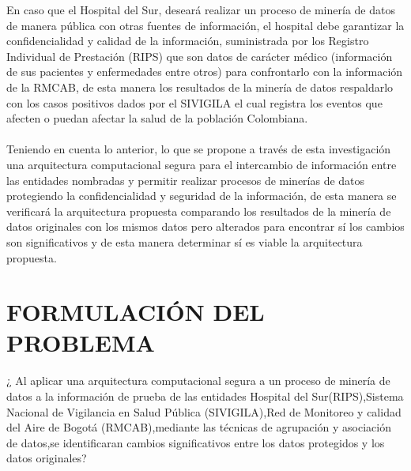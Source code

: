 \documentclass[a4paper,openright,12pt]{book}
\theoremstyle{definition}
\theoremstyle{remark}
\begin{document}
En caso que el Hospital del Sur, deseará realizar un proceso de minería de datos de manera pública con otras fuentes de información, el hospital debe garantizar la confidencialidad y calidad de la información, suministrada por los Registro Individual de Prestación (RIPS) que son datos de carácter médico (información de sus pacientes y enfermedades entre otros) para confrontarlo con la información de la RMCAB, de esta manera los resultados de la minería de datos respaldarlo con los casos positivos dados por el SIVIGILA el cual registra los eventos que afecten o puedan afectar la salud de la población Colombiana.\\\\
Teniendo  en cuenta lo anterior, lo  que se propone  a través de  esta investigación una arquitectura computacional segura para el intercambio de información entre las entidades nombradas y permitir realizar procesos de minerías de datos protegiendo la confidencialidad y seguridad de la información, de esta manera se verificará la arquitectura propuesta comparando los resultados de la minería de datos originales con los mismos datos pero alterados para encontrar sí los cambios son significativos y de esta manera determinar sí es viable la arquitectura propuesta.

\section{FORMULACIÓN DEL PROBLEMA}

¿ Al aplicar una arquitectura computacional segura a un proceso de minería de datos a la información de prueba de las entidades Hospital del Sur(RIPS),Sistema Nacional de Vigilancia en Salud Pública (SIVIGILA),Red de Monitoreo y calidad del Aire de Bogotá (RMCAB),mediante las técnicas de agrupación y asociación de datos,se identificaran cambios significativos entre los datos protegidos y los datos originales?
\end{document}
